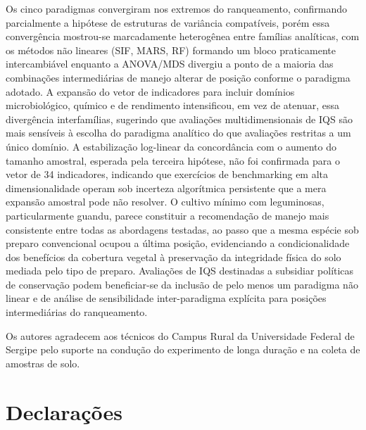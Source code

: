 \documentclass[pdflatex,sn-basic]{sn-jnl}%
\begin{document}
Os cinco paradigmas convergiram nos extremos do ranqueamento, confirmando parcialmente a hipótese de estruturas de variância compatíveis, porém essa convergência mostrou-se marcadamente heterogênea entre famílias analíticas, com os métodos não lineares (SIF, MARS, RF) formando um bloco praticamente intercambiável enquanto a ANOVA/MDS divergiu a ponto de a maioria das combinações intermediárias de manejo alterar de posição conforme o paradigma adotado. A expansão do vetor de indicadores para incluir domínios microbiológico, químico e de rendimento intensificou, em vez de atenuar, essa divergência interfamílias, sugerindo que avaliações multidimensionais de IQS são mais sensíveis à escolha do paradigma analítico do que avaliações restritas a um único domínio. A estabilização log-linear da concordância com o aumento do tamanho amostral, esperada pela terceira hipótese, não foi confirmada para o vetor de 34 indicadores, indicando que exercícios de benchmarking em alta dimensionalidade operam sob incerteza algorítmica persistente que a mera expansão amostral pode não resolver. O cultivo mínimo com leguminosas, particularmente guandu, parece constituir a recomendação de manejo mais consistente entre todas as abordagens testadas, ao passo que a mesma espécie sob preparo convencional ocupou a última posição, evidenciando a condicionalidade dos benefícios da cobertura vegetal à preservação da integridade física do solo mediada pelo tipo de preparo. Avaliações de IQS destinadas a subsidiar políticas de conservação podem beneficiar-se da inclusão de pelo menos um paradigma não linear e de análise de sensibilidade inter-paradigma explícita para posições intermediárias do ranqueamento.

\backmatter



Os autores agradecem aos técnicos do Campus Rural da Universidade Federal de Sergipe pelo suporte na condução do experimento de longa duração e na coleta de amostras de solo.

\section*{Declarações}
\end{document}
